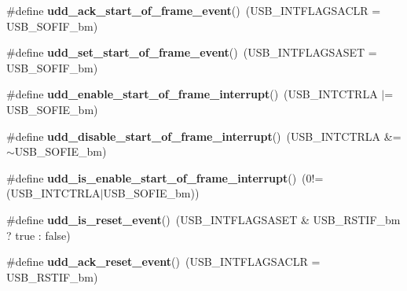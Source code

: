 \begin{DoxyCompactItemize}
\item 
\hypertarget{group__udd__xmega__usb__group_ga0f6802698ef2ff515cdb61ab87d17d02}{\#define {\bfseries udd\-\_\-ack\-\_\-start\-\_\-of\-\_\-frame\-\_\-event}()~(U\-S\-B\-\_\-\-I\-N\-T\-F\-L\-A\-G\-S\-A\-C\-L\-R = U\-S\-B\-\_\-\-S\-O\-F\-I\-F\-\_\-bm)}\label{group__udd__xmega__usb__group_ga0f6802698ef2ff515cdb61ab87d17d02}

\item 
\hypertarget{group__udd__xmega__usb__group_gab3b6d2f80b8e0d1097524e8b6752b3ed}{\#define {\bfseries udd\-\_\-set\-\_\-start\-\_\-of\-\_\-frame\-\_\-event}()~(U\-S\-B\-\_\-\-I\-N\-T\-F\-L\-A\-G\-S\-A\-S\-E\-T = U\-S\-B\-\_\-\-S\-O\-F\-I\-F\-\_\-bm)}\label{group__udd__xmega__usb__group_gab3b6d2f80b8e0d1097524e8b6752b3ed}

\item 
\hypertarget{group__udd__xmega__usb__group_ga14e11a1e75615641ca4192efae6591be}{\#define {\bfseries udd\-\_\-enable\-\_\-start\-\_\-of\-\_\-frame\-\_\-interrupt}()~(U\-S\-B\-\_\-\-I\-N\-T\-C\-T\-R\-L\-A $|$= U\-S\-B\-\_\-\-S\-O\-F\-I\-E\-\_\-bm)}\label{group__udd__xmega__usb__group_ga14e11a1e75615641ca4192efae6591be}

\item 
\hypertarget{group__udd__xmega__usb__group_ga3b77a33bfa47416665714ce24e19706f}{\#define {\bfseries udd\-\_\-disable\-\_\-start\-\_\-of\-\_\-frame\-\_\-interrupt}()~(U\-S\-B\-\_\-\-I\-N\-T\-C\-T\-R\-L\-A \&= $\sim$U\-S\-B\-\_\-\-S\-O\-F\-I\-E\-\_\-bm)}\label{group__udd__xmega__usb__group_ga3b77a33bfa47416665714ce24e19706f}

\item 
\hypertarget{group__udd__xmega__usb__group_ga29d3588870501badf48b406deddd23a7}{\#define {\bfseries udd\-\_\-is\-\_\-enable\-\_\-start\-\_\-of\-\_\-frame\-\_\-interrupt}()~(0!=(U\-S\-B\-\_\-\-I\-N\-T\-C\-T\-R\-L\-A$|$U\-S\-B\-\_\-\-S\-O\-F\-I\-E\-\_\-bm))}\label{group__udd__xmega__usb__group_ga29d3588870501badf48b406deddd23a7}

\item 
\hypertarget{group__udd__xmega__usb__group_gadb4972f859c9a21e2d7f3b0b72755b33}{\#define {\bfseries udd\-\_\-is\-\_\-reset\-\_\-event}()~(U\-S\-B\-\_\-\-I\-N\-T\-F\-L\-A\-G\-S\-A\-S\-E\-T \& U\-S\-B\-\_\-\-R\-S\-T\-I\-F\-\_\-bm ? true \-: false)}\label{group__udd__xmega__usb__group_gadb4972f859c9a21e2d7f3b0b72755b33}

\item 
\hypertarget{group__udd__xmega__usb__group_ga6ae662b05869b4da113e9292623270dd}{\#define {\bfseries udd\-\_\-ack\-\_\-reset\-\_\-event}()~(U\-S\-B\-\_\-\-I\-N\-T\-F\-L\-A\-G\-S\-A\-C\-L\-R = U\-S\-B\-\_\-\-R\-S\-T\-I\-F\-\_\-bm)}\label{group__udd__xmega__usb__group_ga6ae662b05869b4da113e9292623270dd}


\end{DoxyCompactItemize}
